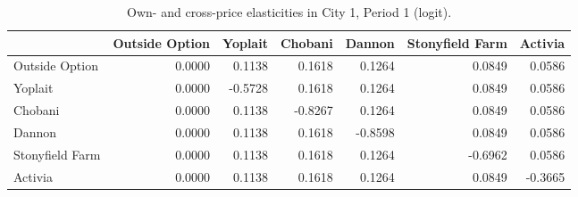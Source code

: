\begin{table}[H]
\centering
\caption{Own- and cross-price elasticities in City 1, Period 1 (logit).}
\label{tab:q4_elasticity_city1p1}
\begin{tabular}{lrrrrrr}
\toprule
 & Outside Option & Yoplait & Chobani & Dannon & Stonyfield Farm & Activia \\
\midrule
Outside Option & 0.0000 & 0.1138 & 0.1618 & 0.1264 & 0.0849 & 0.0586 \\
Yoplait & 0.0000 & -0.5728 & 0.1618 & 0.1264 & 0.0849 & 0.0586 \\
Chobani & 0.0000 & 0.1138 & -0.8267 & 0.1264 & 0.0849 & 0.0586 \\
Dannon & 0.0000 & 0.1138 & 0.1618 & -0.8598 & 0.0849 & 0.0586 \\
Stonyfield Farm & 0.0000 & 0.1138 & 0.1618 & 0.1264 & -0.6962 & 0.0586 \\
Activia & 0.0000 & 0.1138 & 0.1618 & 0.1264 & 0.0849 & -0.3665 \\
\bottomrule
\end{tabular}
\end{table}
